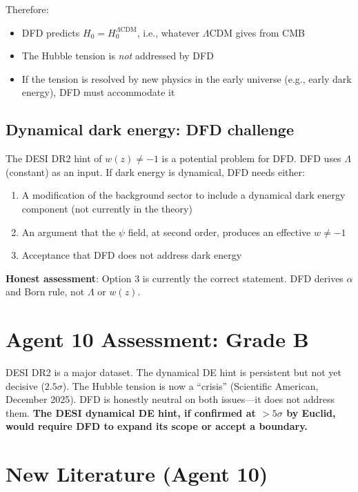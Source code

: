 \documentclass[11pt,a4paper]{article}
\begin{document}
Therefore:
\begin{itemize}
\item DFD predicts $H_0 = H_0^{\Lambda\text{CDM}}$, i.e., whatever $\Lambda$CDM gives from CMB
\item The Hubble tension is \emph{not} addressed by DFD
\item If the tension is resolved by new physics in the early universe (e.g., early dark energy), DFD must accommodate it
\end{itemize}

\subsection{Dynamical dark energy: DFD challenge}

The DESI DR2 hint of $w(z) \neq -1$ is a potential problem for DFD. DFD uses $\Lambda$ (constant) as an input. If dark energy is dynamical, DFD needs either:
\begin{enumerate}
\item A modification of the background sector to include a dynamical dark energy component (not currently in the theory)
\item An argument that the $\psi$ field, at second order, produces an effective $w \neq -1$
\item Acceptance that DFD does not address dark energy
\end{enumerate}

\textbf{Honest assessment}: Option 3 is currently the correct statement. DFD derives $\alpha$ and Born rule, not $\Lambda$ or $w(z)$.

\section{Agent 10 Assessment: Grade B}

DESI DR2 is a major dataset. The dynamical DE hint is persistent but not yet decisive ($2.5\sigma$). The Hubble tension is now a ``crisis'' (Scientific American, December 2025). DFD is honestly neutral on both issues---it does not address them. \textbf{The DESI dynamical DE hint, if confirmed at $> 5\sigma$ by Euclid, would require DFD to expand its scope or accept a boundary.}

\section{New Literature (Agent 10)}
\end{document}
